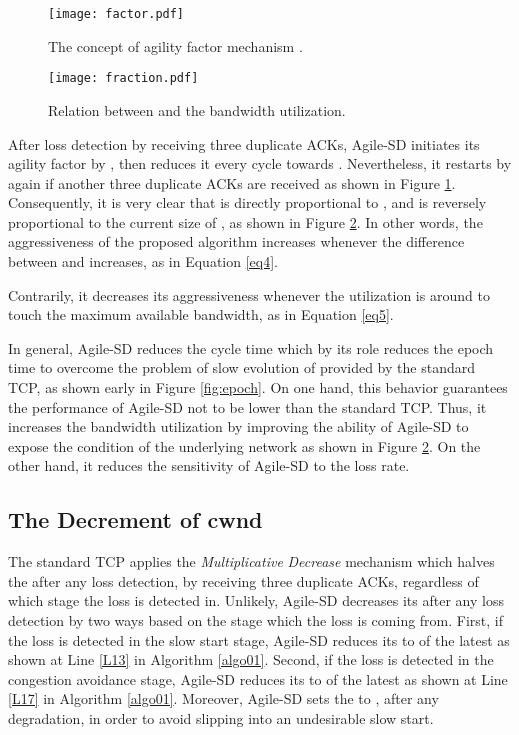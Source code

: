 \documentclass[preprint,3p,times,twocolumn,authoryear]{elsarticle}
\begin{document}
\begin{figure} [t]
\centering
\texttt{[image: factor.pdf]}
\caption{The concept of agility factor mechanism .}
\label{fig:factor}
\end{figure}

\begin{figure} [t]
\centering
\texttt{[image: fraction.pdf]}
\caption{Relation between  and the bandwidth utilization.}
\label{fig:fraction}
\end{figure}


After loss detection by receiving three duplicate ACKs, Agile-SD initiates its agility factor by , then reduces it every cycle towards . Nevertheless, it restarts by  again if another three duplicate ACKs are received as shown in Figure \ref{fig:factor}. Consequently, it is very clear that  is directly proportional to , and  is reversely proportional to the current size of , as shown in Figure \ref{fig:fraction}. In other words, the aggressiveness of the proposed algorithm increases whenever the difference between  and  increases, as in Equation \eqref{eq4}. 



Contrarily, it decreases its aggressiveness whenever the utilization is around to touch the maximum available bandwidth, as in Equation \eqref{eq5}. 


In general, Agile-SD reduces the cycle time which by its role reduces the epoch time to overcome the problem of slow evolution of  provided by the standard TCP, as shown early in Figure \ref{fig:epoch}. On one hand, this behavior guarantees the performance of Agile-SD not to be lower than the standard TCP. Thus, it increases the bandwidth utilization by improving the ability of Agile-SD to expose the condition of the underlying network as shown in Figure \ref{fig:fraction}. On the other hand, it reduces the sensitivity of Agile-SD to the loss rate.

\subsection{The Decrement of cwnd}

The standard TCP applies the \textit{Multiplicative} \textit{Decrease} mechanism which halves the  after any loss detection, by receiving three duplicate ACKs, regardless of which stage the loss is detected in. Unlikely, Agile-SD decreases its  after any loss detection by two ways based on the stage which the loss is coming from. First, if the loss is detected in the slow start stage, Agile-SD reduces its  to  of the latest  as shown at Line \ref{L13} in Algorithm \ref{algo01}. Second, if the loss is detected in the congestion avoidance stage, Agile-SD reduces its  to  of the latest   as shown at Line \ref{L17} in Algorithm \ref{algo01}. Moreover, Agile-SD sets the  to , after any degradation, in order to avoid slipping into an undesirable slow start.
\end{document}
